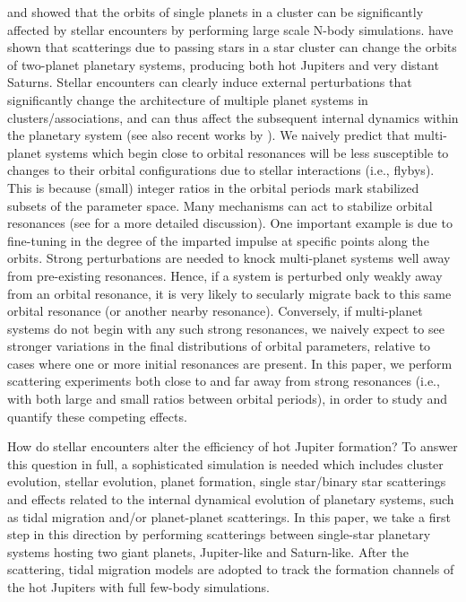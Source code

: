 \documentclass[twocolumn]{aastex63}
\begin{document}
\citet{ Hurley2002, Spurzem2009} and  \citet{Parker2012} showed that the orbits of single planets in a cluster can be significantly affected by stellar encounters by performing large scale N-body simulations. \citet{Shara2016} have shown that scatterings due to passing stars in a star cluster can change the orbits of two-planet planetary systems, producing both hot Jupiters and very distant Saturns. Stellar encounters can clearly induce external perturbations that significantly change the architecture of multiple planet systems in clusters/associations, and can thus affect the subsequent internal dynamics within the planetary system
(see also recent works by \citealt{Cai2019,Flammini2019,Li2020,Wang2020a,Wang2020b}). 
We naively predict that multi-planet systems which begin close to orbital resonances will be less susceptible to changes to their orbital configurations due to stellar interactions (i.e., flybys).  This is because (small) integer ratios in the orbital periods mark stabilized subsets of the parameter space.  Many mechanisms can act to stabilize orbital resonances (see \citet{murray99} for a more detailed discussion).  One important example is due to fine-tuning in the degree of the imparted impulse at specific points along the orbits.  Strong perturbations are needed to knock multi-planet systems well away from pre-existing resonances.  Hence, if a system is perturbed only weakly away from an orbital resonance, it is very likely to secularly migrate back to this same orbital resonance (or another nearby resonance).  Conversely, if multi-planet systems do not begin with any such strong resonances, we naively expect to see stronger variations in the final distributions of orbital parameters, relative to cases where one or more initial resonances are present.  In this paper, we perform scattering experiments both close to and far away from strong resonances (i.e., with both large and small ratios between orbital periods), in order to study and quantify these competing effects.

How do stellar encounters alter the efficiency of hot Jupiter formation? To answer this question in full, a sophisticated simulation is needed which includes cluster evolution, stellar evolution, planet formation, single star/binary star scatterings and effects related to the internal dynamical evolution of planetary systems, such as tidal migration and/or planet-planet scatterings. In this paper, we take a first step in this direction by performing scatterings between single-star planetary systems hosting two giant planets, Jupiter-like and Saturn-like. After the scattering, tidal migration models are adopted to track the formation channels of the hot Jupiters with full few-body simulations. 
\end{document}
